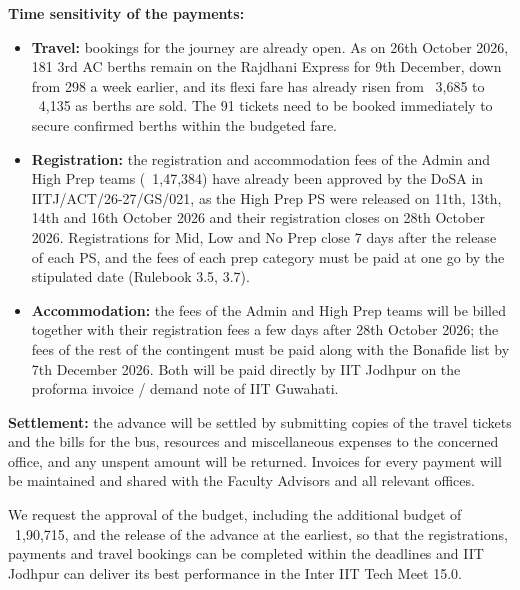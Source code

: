 \documentclass[11pt,letterpaper]{article}
\newcommand{\rs}{{\rupee}}
\begin{document}
\textbf{Time sensitivity of the payments:}
\begin{itemize}
  \item \textbf{Travel:} bookings for the journey are already open. As on 26th October 2026, 181 3rd AC berths remain on the Rajdhani Express for 9th December, down from 298 a week earlier, and its flexi fare has already risen from \rs~3,685 to \rs~4,135 as berths are sold. The 91 tickets need to be booked immediately to secure confirmed berths within the budgeted fare.
  \item \textbf{Registration:} the registration and accommodation fees of the Admin and High Prep teams (\rs~1,47,384) have already been approved by the DoSA in IITJ/ACT/26-27/GS/021, as the High Prep PS were released on 11th, 13th, 14th and 16th October 2026 and their registration closes on 28th October 2026. Registrations for Mid, Low and No Prep close 7 days after the release of each PS, and the fees of each prep category must be paid at one go by the stipulated date (Rulebook 3.5, 3.7).
  \item \textbf{Accommodation:} the fees of the Admin and High Prep teams will be billed together with their registration fees a few days after 28th October 2026; the fees of the rest of the contingent must be paid along with the Bonafide list by 7th December 2026. Both will be paid directly by IIT Jodhpur on the proforma invoice / demand note of IIT Guwahati.
\end{itemize}

\textbf{Settlement:} the advance will be settled by submitting copies of the travel tickets and the bills for the bus, resources and miscellaneous expenses to the concerned office, and any unspent amount will be returned. Invoices for every payment will be maintained and shared with the Faculty Advisors and all relevant offices.

We request the approval of the budget, including the additional budget of \rs~1,90,715, and the release of the advance at the earliest, so that the registrations, payments and travel bookings can be completed within the deadlines and IIT Jodhpur can deliver its best performance in the Inter IIT Tech Meet 15.0.
\end{document}
